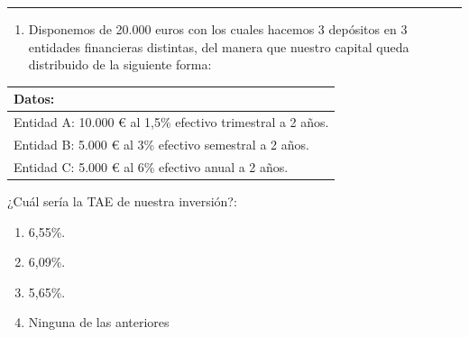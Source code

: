 \documentclass[
  letterpaper,
  DIV=11,
  numbers=noendperiod]{scrreprt}
\providecommand{\tightlist}{%
  \setlength{\itemsep}{0pt}\setlength{\parskip}{0pt}}\usepackage{longtable,booktabs,array}
\begin{document}
\begin{center}\rule{0.5\linewidth}{0.5pt}\end{center}

\begin{enumerate}
\def\labelenumi{\arabic{enumi}.}
\setcounter{enumi}{67}
\tightlist
\item
  Disponemos de 20.000 euros con los cuales hacemos 3 depósitos en 3
  entidades financieras distintas, del manera que nuestro capital queda
  distribuido de la siguiente forma:
\end{enumerate}

\begin{longtable}[]{@{}l@{}}
\toprule()
\textbf{Datos:} \\
\midrule()
\endhead
Entidad A: 10.000 € al 1,5\% efectivo trimestral a 2 años. \\
Entidad B: 5.000 € al 3\% efectivo semestral a 2 años. \\
Entidad C: 5.000 € al 6\% efectivo anual a 2 años. \\
\bottomrule()
\end{longtable}

¿Cuál sería la TAE de nuestra inversión?:

\begin{enumerate}
\def\labelenumi{\alph{enumi}.}
\item
  6,55\%.
\item
  6,09\%.
\item
  5,65\%.
\item
  Ninguna de las anteriores
\end{enumerate}
\end{document}
